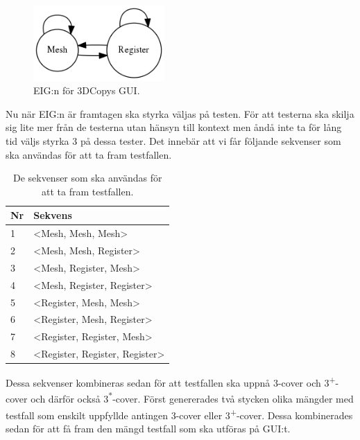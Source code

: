 \begin{figure}[H]
	\centering
	\includegraphics[width=50mm]{figures/3DCopyGUIEIG.png}
	\caption{EIG:n för 3DCopys GUI.}
	\label{fig:3dcopy_guieig}
\end{figure}

Nu när EIG:n är framtagen ska styrka väljas på testen. För att testerna ska skilja sig lite mer från de testerna utan hänsyn till kontext men åndå inte ta för lång tid väljs styrka 3 på dessa tester. Det innebär att vi får följande sekvenser som ska användas för att ta fram testfallen.

\begin{table}[h]
	\caption{De sekvenser som ska användas för att ta fram testfallen.}
	\label{tbl:test_seq}
	\centering
\begin{tabular}{|l|l|}
	\hline
	\textbf{Nr} & \textbf{Sekvens} \\
	\hline
	1 & <Mesh, Mesh, Mesh> \\
	\hline
	2 & <Mesh, Mesh, Register> \\
	\hline
	3 & <Mesh, Register, Mesh> \\
	\hline
	4 & <Mesh, Register, Register> \\
	\hline
	5 & <Register, Mesh, Mesh> \\
	\hline
	6 & <Register, Mesh, Register> \\
	\hline
	7 & <Register, Register, Mesh> \\
	\hline
	8 & <Register, Register, Register> \\
	\hline
\end{tabular}
\end{table}

Dessa sekvenser kombineras sedan för att testfallen ska uppnå 3-cover och 3\textsuperscript{+}-cover och därför också 3\textsuperscript{*}-cover. Först genererades två stycken olika  mängder med testfall som enskilt uppfyllde antingen 3-cover eller 3\textsuperscript{+}-cover. Dessa kombinerades sedan för att få fram den mängd testfall som ska utföras på GUI:t.

